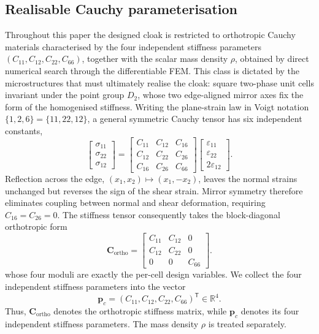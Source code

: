 \documentclass[preprint,12pt]{elsarticle}
\newcommand{\mbf}[1]{\mathbf{#1}}
\newcommand{\be}{\begin{equation}}
\newcommand{\ee}{\end{equation}}
\begin{document}
\subsection{Realisable Cauchy parameterisation}\label{subsec:flat4}

Throughout this paper the designed cloak is restricted to orthotropic
Cauchy materials characterised by the four independent stiffness
parameters $(C_{11},C_{12},C_{22},C_{66})$, together with the scalar
mass density $\rho$, obtained by direct numerical search through the
differentiable FEM. This class is dictated by the microstructures that
must ultimately realise the cloak: square
two-phase unit cells invariant under the point group $D_2$, whose two
edge-aligned mirror axes fix the form of the homogenised stiffness.
Writing the plane-strain law in Voigt notation $\{1,2,6\}=\{11,22,12\}$,
a general symmetric Cauchy tensor has six independent constants,
\be\label{eq:cauchy_general}
  \begin{bmatrix}\sigma_{11}\\ \sigma_{22}\\ \sigma_{12}\end{bmatrix}
  =
  \begin{bmatrix}
    C_{11} & C_{12} & C_{16}\\
    C_{12} & C_{22} & C_{26}\\
    C_{16} & C_{26} & C_{66}
  \end{bmatrix}
  \begin{bmatrix}\varepsilon_{11}\\ \varepsilon_{22}\\ 2\varepsilon_{12}\end{bmatrix}.
\ee
Reflection across the edge, $(x_1,x_2)\mapsto(x_1,-x_2)$, leaves the normal strains unchanged
but reverses the sign of the shear strain. Mirror symmetry therefore eliminates
coupling between normal and shear deformation, requiring $C_{16}=C_{26}=0$.
The stiffness tensor consequently takes the block-diagonal orthotropic form
\be\label{eq:orthotropic}
  \mbf{C}_{\mathrm{ortho}}
  =
  \begin{bmatrix}
    C_{11} & C_{12} & 0\\
    C_{12} & C_{22} & 0\\
    0 & 0 & C_{66}
  \end{bmatrix}.
\ee
whose four moduli are exactly the per-cell design variables. We collect the four independent stiffness parameters into the vector
\be\label{eq:stiffness_vector}
  \mbf{p}_c
  =
  (C_{11},C_{12},C_{22},C_{66})^{\mathsf T}
  \in\mathbb{R}^{4}.
\ee
Thus, $\mbf{C}_{\mathrm{ortho}}$ denotes the orthotropic stiffness
matrix, while $\mbf{p}_c$ denotes its four independent stiffness
parameters. The mass density $\rho$ is treated separately.
\end{document}
